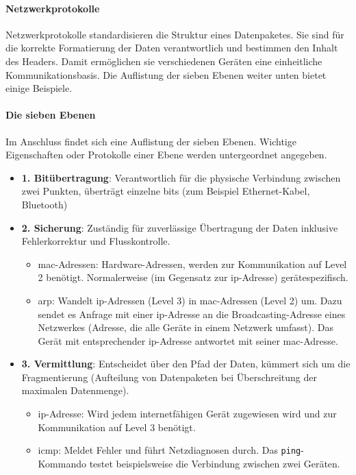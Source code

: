 \documentclass[11pt, a4paper]{article}
\begin{document}
\paragraph{Netzwerkprotokolle}
Netzwerkprotokolle standardisieren die Struktur eines Datenpaketes. Sie sind für die korrekte Formatierung der Daten verantwortlich und bestimmen den Inhalt des Headers. Damit ermöglichen sie verschiedenen Geräten eine einheitliche Kommunikationsbasis. Die Auflistung der sieben Ebenen weiter unten bietet einige Beispiele.
\paragraph{Die sieben Ebenen}
Im Anschluss findet sich eine Auflistung der sieben Ebenen. Wichtige Eigenschaften oder Protokolle einer Ebene werden untergeordnet angegeben.
\begin{itemize}
	\item \textbf{1. Bitübertragung}: Verantwortlich für die physische Verbindung zwischen zwei Punkten, überträgt einzelne \glspl{bit} (zum Beispiel Ethernet-Kabel, Bluetooth)
	\item \textbf{2. Sicherung}: Zuständig für zuverlässige Übertragung der Daten inklusive Fehlerkorrektur und Flusskontrolle.
	\begin{itemize}
		\item \gls{mac}-Adressen: Hardware-Adressen, werden zur Kommunikation auf Level 2 benötigt. Normalerweise (im Gegensatz zur \gls{ip}-Adresse) gerätespezifisch.
		\item \gls{arp}: Wandelt \gls{ip}-Adressen (Level 3) in \gls{mac}-Adressen (Level 2) um. Dazu sendet es Anfrage mit einer \gls{ip}-Adresse an die Broadcasting-Adresse eines Netzwerkes (Adresse, die alle Geräte in einem Netzwerk umfasst). Das Gerät mit entsprechender \gls{ip}-Adresse antwortet mit seiner \gls{mac}-Adresse.
	\end{itemize}
	\item \textbf{3. Vermittlung}: Entscheidet über den Pfad der Daten, kümmert sich um die Fragmentierung (Aufteilung von Datenpaketen bei Überschreitung der maximalen Datenmenge).
	\begin{itemize}
		\item \gls{ip}-Adresse: Wird jedem internetfähigen Gerät zugewiesen wird und zur Kommunikation auf Level 3 benötigt.
		\item \gls{icmp}: Meldet Fehler und führt Netzdiagnosen durch. Das \texttt{ping}-Kommando testet beispielsweise die Verbindung zwischen zwei Geräten.~\cite{ICMPFortinet:online}

\end{itemize}
\end{itemize}
\end{document}
